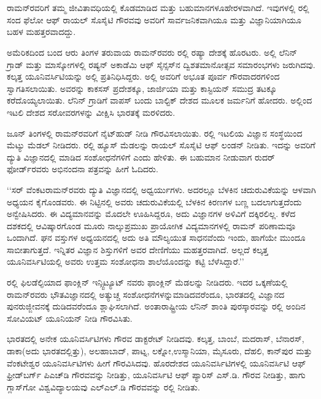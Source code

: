 
\chapter{}


ರಾಮನ್‍ರವರಿಗೆ ತಮ್ಮ ಜೀವಿತಾವಧಿಯಲ್ಲಿ ಕೊಡಮಾಡಿದ ಮತ್ತು ಬಹುಮಾನಗಳೂ\break ಹೇರಳವಾಗಿದೆ. ಇವುಗಳಲ್ಲಿ  ರಲ್ಲಿ ಸಂದ ಫೆಲೋ ಆಫ್ ರಾಯಲ್ ಸೊಸೈಟಿ ಗೌರವವು ಅವರಿಗೆ ಸಾರ್ವಜನಿಕವಾಗಿಯೂ ಮತ್ತು ವಿಜ್ಞಾನಿಯಾಗಿಯೂ ಬಹಳ ಮಹತ್ತರವಾದದ್ದು.

ಅಮೆರಿಕದಿಂದ ಬಂದ ಆರು ತಿಂಗಳ ತರುವಾಯ ರಾಮನ್‌ರವರು  ರಲ್ಲಿ ರಷ್ಯಾ ದೇಶಕ್ಕೆ ಹೊರಟರು. ಅಲ್ಲಿ ಲೆನಿನ್ ಗ್ರಾಡ್ ಮತ್ತು ಮಾಸ್ಕೋಗಳಲ್ಲಿ ರಷ್ಯನ್ ಅಕಾಡೆಮಿ ಆಫ್ ಸೈನ್ಸಸ್‌ನ ದ್ವಿಶತಮಾನೋತ್ಸವ ಸಮಾರಂಭಗಳು ಜರುಗಿದವು. ಕಲ್ಕತ್ತ ಯೂನಿವರ್ಸಿಟಿಯನ್ನು ಅಲ್ಲಿ ಪ್ರತಿನಿಧಿಸಿದ್ದರು. ಅಲ್ಲಿ ಅವರಿಗೆ ಅಭೂತ ಪೂರ್ವ ಗೌರವಾದರಗಳಿಂದ ಸ್ವಾಗತಿಸಲಾಯಿತು. ಅವರನ್ನು ಕಾಕಸಸ್ ಪ್ರದೇಶಕ್ಕೂ, ಜಾರ್ಜಿಯಾ ಮತ್ತು ಕಾಸ್ಟಿಯನ್ ಸಮುದ್ರ ತಟಕ್ಕೂ ಕರೆದೊಯ್ಯ\-ಲಾಯಿತು. ಲೆನಿನ್ ಗ್ರಾಡಿಗೆ ವಾಪಸ್ ಬಂದು ಬಾಲ್ಟಿಕ್ ದೇಶದ ಮೂಲಕ ಜರ್ಮನಿಗೆ ಹೋದರು. ಅಲ್ಲಿಂದ ಇಟಲಿ ದೇಶದ ಸರೋವರಗಳನ್ನು ವೀಕ್ಷಿಸಿ ಭಾರತಕ್ಕೆ ಮರಳಿದರು. 

 ಜೂನ್ ತಿಂಗಳಲ್ಲಿ ರಾಮನ್‍ರವರಿಗೆ ನೈಟ್‌ಹುಡ್ ನೀಡಿ ಗೌರವಿಸಲಾಯಿತು.  ರಲ್ಲಿ ಇಟಲಿಯ ವಿಜ್ಞಾನ ಸಂಸ್ಥೆಯಿಂದ ಮೆಟ್ಯು ಮೆಡಲ್ ನೀಡಿದರು.  ರಲ್ಲಿ ಹ್ಯೂಸ್ ಮೆಡಲನ್ನು ರಾಯಲ್ ಸೊಸೈಟಿ ಆಫ್ ಲಂಡನ್ ನೀಡಿತು. ಇದನ್ನು ಅವರಿಗೆ ದ್ಯುತಿ ವಿಜ್ಞಾನದಲ್ಲಿ ಮಾಡಿದ ಸಂಶೋಧನೆಗಳಿಗೆ ಎಂದು ಹೇಳಿತು. ಈ ಬಹುಮಾನ ನೀಡುವಾಗ ರುದರ್ ಫೋರ್ಡ್‌ರವರು ಅಭಿನಂದನಾ ಪತ್ರವನ್ನು ಹೀಗೆ ಓದಿದರು.

‘‘ಸರ್ ವೆಂಕಟರಾಮನ್‌ರವರು ದ್ಯುತಿ ವಿಜ್ಞಾನದಲ್ಲಿ ಅಧ್ವರ್ಯುಗಳು. ಅದರಲ್ಲೂ ಬೆಳಕಿನ ಚದುರುವಿಕೆಯನ್ನು ಆಳವಾಗಿ ಅಧ್ಯಯನ ಕೈಗೊಂಡವರು. ಈ ನಿಟ್ಟಿನಲ್ಲಿ ಅವರು ಚದುರುವಿಕೆಯಲ್ಲಿ ಬೆಳಕಿನ ಕಿರಣಗಳ ಬಣ್ಣ ಬದಲಾಗುತ್ತದೆಂದು ಅನ್ವೇಷಿಸಿದರು. ಈ ವಿದ್ಯಮಾನವನ್ನು ಮೊದಲೇ ಊಹಿಸಿದ್ದರೂ, ಅದು ವಿಜ್ಞಾನಗಳ ಅಳಿವಿಗೆ ದಕ್ಕಿರಲಿಲ್ಲ. ಕಳೆದ ದಶಕದಲ್ಲಿ ಆವಿಷ್ಕಾರಗೊಂಡ ಮೂರು ನಾಲ್ಕುಪ್ರಮುಖ ಪ್ರಾಯೋಗಿಕ ವಿದ್ಯಮಾನಗಳಲ್ಲಿ ರಾಮನ್ ಪರಿಣಾಮವೂ ಒಂದಾಗಿದೆ. ಘನ ವಸ್ತುಗಳ ಅಧ್ಯಯನದಲ್ಲಿ ಅದು ಅತಿ ಮೌಲ್ಯಯುತ ಸಾಧನವೆಂದು ಇಂದು, ಹಾಗೆಯೇ ಮುಂದೂ ಸಾಬೀತಾಗುತ್ತದೆ. ಇನ್ನಿತರ ವಿಜ್ಞಾನ ಶಿಸ್ತುಗಳಿಗೆ ಅವರ ದೇಣಿಗೆಯು ಮಹತ್ತರವಾಗಿದೆ. ಅಲ್ಲದೆ ಕಲ್ಕತ್ತ ಯೂನಿವರ್ಸಿಟಿಯಲ್ಲಿ ಅವರು ಉತ್ತಮ ಸಂಶೋಧನಾ ಶಾಲೆಯೊಂದನ್ನು ಕಟ್ಟಿ ಬೆಳೆಸಿದ್ದಾರೆ.’’

ರಲ್ಲಿ ಫಿಲಡೆಲ್ಫಿಯಾದ ಫಾಂಕ್ಲಿನ್ ಇನ್ಸ್ಟಿಟ್ಯೂಟ್ ನವರು ಫಾಂಕ್ಲಿನ್ ಮೆಡಲನ್ನು ನೀಡಿದರು. ಇದರ ಒಕ್ಕಣೆಯಲ್ಲಿ ರಾಮನ್‌ರವರು ಭೌತವಿಜ್ಞಾನದಲ್ಲಿ ಅತ್ಯುಚ್ಚ ಸಂಶೋಧನೆಗಳನ್ನು\break ಮಾಡಿದವರೆಂದೂ, ಭಾರತದಲ್ಲಿ ವಿಜ್ಞಾನದ ಪುನರುಜ್ಜೀವನಕ್ಕೆ ದುಡಿದವರೆಂದೂ ಶ್ಲಾಘಿಸಲಾಗಿದೆ. ಅಂತಾರಾಷ್ಟ್ರೀಯ ಲೆನಿನ್ ಶಾಂತಿ ಪುರಸ್ಕಾರವನ್ನು  ರಲ್ಲಿ ಅಂದಿನ ಸೋವಿಯಟ್ ಯೂನಿಯನ್ ನೀಡಿ ಗೌರವಿಸಿತು.

ಭಾರತದಲ್ಲಿ ಅನೇಕ ಯೂನಿವರ್ಸಿಟಿಗಳು ಗೌರವ ಡಾಕ್ಟರೇಟ್ ನೀಡಿದವು. ಕಲ್ಕತ್ತ, ಬಾಂಬೆ, ಮದರಾಸ್, ಬೆನಾರಸ್, ಡಾಕಾ(ಅದು ಭಾರತದಲ್ಲಿತ್ತು), ಅಲಹಾಬಾದ್, ಪಾಟ್ನ, ಲಕ್ನೋ,\break ಉಸ್ಮಾನಿಯಾ, ಮೈಸೂರು, ದೆಹಲಿ, ಕಾನ್‌ಪುರ ಮತ್ತು ವೆಂಕಟೇಶ್ವರ ಯೂನಿವರ್ಸಿಟಿಗಳು ಹೀಗೆ ಗೌರವಿಸಿದವು. ಹೊರದೇಶದ ಯೂನಿವರ್ಸಿಟಿಗಳಲ್ಲಿ ಯೂನಿವರ್ಸಿಟಿ ಆಫ್ ಫ್ರೀಡ್‌ಬರ್ಗ್ ಪಿಎಚ್‌ಡಿ ಗೌರವವನ್ನು ನೀಡಿತ್ತು, ಯೂನಿವರ್ಸಿಟಿ ಆಫ್ ಪ್ಯಾರಿಸ್ ಎಸ್.ಡಿ. ಗೌರವ ನೀಡಿತ್ತು, ಹಾಗು ಗ್ಲಾಸ್‌ಗೋ ವಿಶ್ವವಿದ್ಯಾಲಯವು ಎಲ್ಎಲ್.ಡಿ ಗೌರವವನ್ನು  ರಲ್ಲಿ ನೀಡಿತು. 

